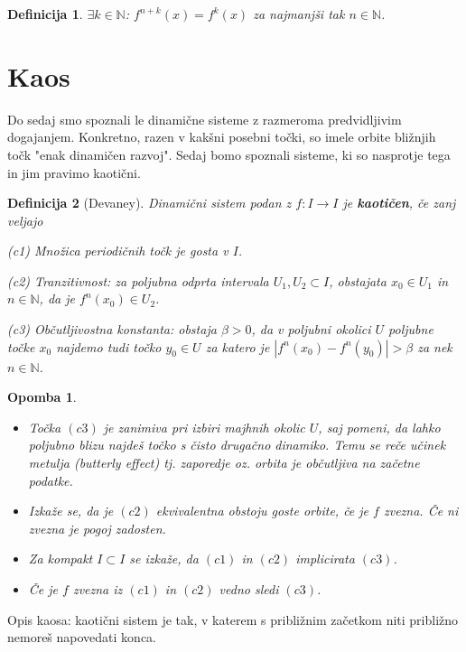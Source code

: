 \documentclass{article}
\newtheorem{definicija}{Definicija}
\newtheorem{opomba}{Opomba}
\newcommand{\N}{\mathbb{N}}
\begin{document}
\begin{definicija}
$\exists k\in \N$: $f^{n+k}(x) = f^k(x)$ za  najmanjši tak $n\in \N$.
\end{definicija}

\section{Kaos}
Do sedaj smo spoznali le dinamične sisteme z razmeroma predvidljivim dogajanjem. Konkretno, razen v kakšni posebni točki, so imele orbite bližnjih točk "enak dinamičen razvoj". Sedaj bomo spoznali sisteme, ki so nasprotje tega in jim pravimo kaotični. 

\begin{definicija}[Devaney]
Dinamični sistem podan z $f:I \rightarrow I$ je \textbf{kaotičen}, če zanj veljajo
\item[(c1)] Množica periodičnih točk je gosta v $I$.
\item[(c2)] Tranzitivnost: za poljubna odprta intervala $U_1, U_2 \subset I$, obstajata $x_0\in U_1$ in $n\in \N$, da je $f^n(x_0) \in U_2$.
\item[(c3)] Občutljivostna konstanta: obstaja $\beta > 0$, da v poljubni okolici $U$ poljubne točke $x_0$ najdemo tudi točko $y_0 \in U$ za katero je $|f^n(x_0) - f^n(y_0)| > \beta$ za nek $n\in \N$.
\end{definicija}

\begin{opomba}
\hfill 
\begin{itemize}
\item Točka $(c3)$ je zanimiva pri izbiri majhnih okolic $U$, saj pomeni, da lahko poljubno blizu najdeš točko s čisto drugačno dinamiko. Temu se reče učinek metulja (butterly effect) tj. zaporedje oz. orbita je občutljiva na začetne podatke.
\item Izkaže se, da je $(c2)$ ekvivalentna obstoju goste orbite, če je $f$ zvezna. Če ni zvezna je pogoj zadosten.
\item Za kompakt $I \subset I$ se izkaže, da $(c1)$ in $(c2)$ implicirata $(c3)$.
\item Če je $f$ zvezna iz $(c1)$ in $(c2)$ vedno sledi $(c3)$.
\end{itemize}
\end{opomba}
\noindent
Opis kaosa: kaotični sistem je tak, v katerem s približnim začetkom niti približno nemoreš napovedati konca.
\end{document}
